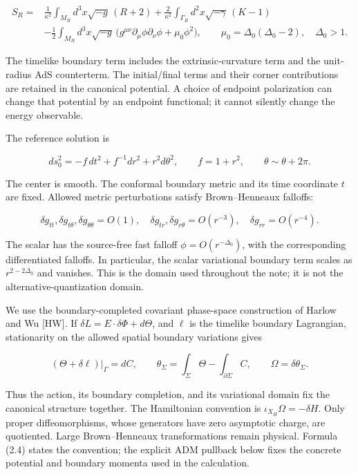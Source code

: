 \documentclass[a4paper,11pt]{article}
\numberwithin{equation}{section}
\begin{document}
\[
\begin{aligned}
S_R={}&\frac1{\kappa^2}\int_{M_R}d^3x\sqrt{-g}\,(R+2)
+\frac2{\kappa^2}\int_{\Gamma_R}d^2x\sqrt{-\gamma}\,(K-1)\\
&-\frac12\int_{M_R}d^3x\sqrt{-g}\,
\bigl(g^{\mu\nu}\partial_\mu\phi\partial_\nu\phi+\mu_0\phi^2\bigr),
\qquad
\mu_0=\Delta_0(\Delta_0-2),\quad \Delta_0>1 .
\end{aligned}
\tag{2.1}
\]

The timelike boundary term includes the extrinsic-curvature term and the unit-radius AdS counterterm. The initial/final terms and their corner contributions are retained in the canonical potential. A choice of endpoint polarization can change that potential by an endpoint functional; it cannot silently change the energy observable.

The reference solution is

\[
ds_0^2=-f\,dt^2+f^{-1}dr^2+r^2d\theta^2,
\qquad f=1+r^2,\qquad \theta\sim\theta+2\pi .
\tag{2.2}
\]

The center is smooth. The conformal boundary metric and its time coordinate \(t\) are fixed. Allowed metric perturbations satisfy Brown--Henneaux falloffs:

\[
\delta g_{tt},\delta g_{t\theta},\delta g_{\theta\theta}=O(1),
\quad
\delta g_{tr},\delta g_{r\theta}=O(r^{-3}),
\quad
\delta g_{rr}=O(r^{-4}).
\tag{2.3}
\]

The scalar has the source-free fast falloff \(\phi=O(r^{-\Delta_0})\), with the corresponding differentiated falloffs. In particular, the scalar variational boundary term scales as \(r^{2-2\Delta_0}\) and vanishes. This is the domain used throughout the note; it is not the alternative-quantization domain.

We use the boundary-completed covariant phase-space construction of Harlow and Wu {[}HW{]}. If \(\delta L=E\cdot\delta\Phi+d\Theta\), and \(\ell\) is the timelike boundary Lagrangian, stationarity on the allowed spatial boundary variations gives

\[
(\Theta+\delta\ell)|_{\Gamma}=dC,\qquad
\theta_\Sigma=\int_\Sigma\Theta-\int_{\partial\Sigma}C,
\qquad
\Omega=\delta\theta_\Sigma .
\tag{2.4}
\]

Thus the action, its boundary completion, and its variational domain fix the canonical structure together. The Hamiltonian convention is \(\iota_{X_H}\Omega=-\delta H\). Only proper diffeomorphisms, whose generators have zero asymptotic charge, are quotiented. Large Brown--Henneaux transformations remain physical. Formula (2.4) states the convention; the explicit ADM pullback below fixes the concrete potential and boundary momenta used in the calculation.
\end{document}

